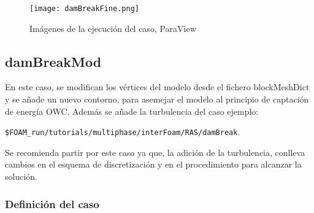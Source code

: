 \begin{figure}[ht]
\centering
\texttt{[image: damBreakFine.png]}
\caption{Imágenes de la ejecución del caso, ParaView}
\label{fig:damBreakFine}
\end{figure}

\subsection{damBreakMod}\label{header-n750}

En este caso, se modifican los vértices del modelo desde el fichero
blockMeshDict y se añade un nuevo contorno, para asemejar el modelo al
principio de captación de energía OWC. Además se añade la turbulencia
del caso ejemplo:

\lstinline[style=bash]{$FOAM_run/tutorials/multiphase/interFoam/RAS/damBreak}.

Se recomienda partir por este caso ya que, la adición de la turbulencia,
conlleva cambios en el esquema de discretización y en el procedimiento
para alcanzar la solución.

\subsubsection{Definición del caso}\label{header-n755}

